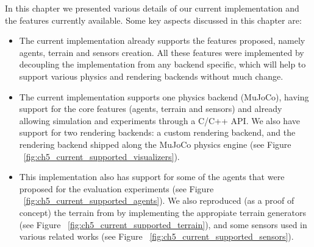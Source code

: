 In this chapter we presented various details of our current implementation and
the features currently available. Some key aspects discussed in this chapter are:

\begin{itemize}
    \item The current implementation already supports the features proposed, namely
          agents, terrain and sensors creation. All these features were implemented
          by decoupling the implementation from any backend specific, which will help 
          to support various physics and rendering backends without much change.

    \item The current implementation supports one physics backend (MuJoCo),
          having support for the core features (agents, terrain and sensors) and
          already allowing simulation and experiments through a C/C++ API.
          We also have support for two rendering backends: a custom rendering backend,
          and the rendering backend shipped along the MuJoCo physics engine 
          (see Figure ~\ref{fig:ch5_current_supported_visualizers}).

    \item This implementation also has support for some of the agents that were
          proposed for the evaluation experiments (see Figure ~\ref{fig:ch5_current_supported_agents}).
          We also reproduced (as a proof of concept) the terrain from \cite{DeepmindEmergenceLocomotion} 
          by implementing the appropiate terrain generators (see Figure ~\ref{fig:ch5_current_supported_terrain}),
          and some sensors used in various related works (see Figure ~\ref{fig:ch5_current_supported_sensors}).
\end{itemize}